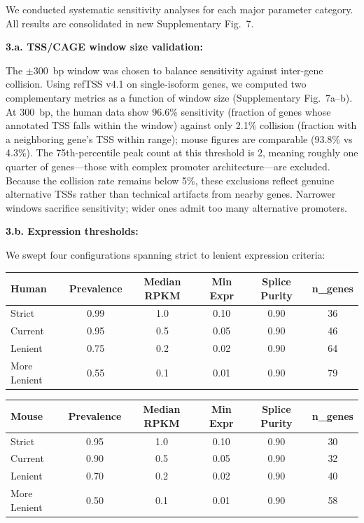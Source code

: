 \documentclass[11pt]{article}
\begin{document}
\begin{responseboxnew}
We conducted systematic sensitivity analyses for each major parameter category. All results are consolidated in new Supplementary Fig.~7.

\vspace{0.3cm}
\textbf{3.a. TSS/CAGE window size validation:}

The $\pm$300~bp window was chosen to balance sensitivity against inter-gene collision. Using refTSS v4.1 on single-isoform genes, we computed two complementary metrics as a function of window size (Supplementary Fig.~7a--b). At 300~bp, the human data show 96.6\% sensitivity (fraction of genes whose annotated TSS falls within the window) against only 2.1\% collision (fraction with a neighboring gene's TSS within range); mouse figures are comparable (93.8\% vs 4.3\%). The 75th-percentile peak count at this threshold is 2, meaning roughly one quarter of genes---those with complex promoter architecture---are excluded. Because the collision rate remains below 5\%, these exclusions reflect genuine alternative TSSs rather than technical artifacts from nearby genes. Narrower windows sacrifice sensitivity; wider ones admit too many alternative promoters.

\vspace{0.3cm}
\textbf{3.b. Expression thresholds:}

We swept four configurations spanning strict to lenient expression criteria:

\vspace{0.2cm}
\begin{center}
\small
\begin{tabular}{lccccc}
\toprule
\textbf{Human} & Prevalence & Median RPKM & Min Expr & Splice Purity & n\_genes \\
\midrule
Strict       & 0.99 & 1.0 & 0.10 & 0.90 & 36 \\
Current      & 0.95 & 0.5 & 0.05 & 0.90 & 46 \\
Lenient      & 0.75 & 0.2 & 0.02 & 0.90 & 64 \\
More Lenient & 0.55 & 0.1 & 0.01 & 0.90 & 79 \\
\bottomrule
\end{tabular}

\vspace{0.3cm}

\begin{tabular}{lccccc}
\toprule
\textbf{Mouse} & Prevalence & Median RPKM & Min Expr & Splice Purity & n\_genes \\
\midrule
Strict       & 0.95 & 1.0 & 0.10 & 0.90 & 30 \\
Current      & 0.90 & 0.5 & 0.05 & 0.90 & 32 \\
Lenient      & 0.70 & 0.2 & 0.02 & 0.90 & 40 \\
More Lenient & 0.50 & 0.1 & 0.01 & 0.90 & 58 \\
\bottomrule
\end{tabular}
\end{center}


\end{responseboxnew}
\end{document}
